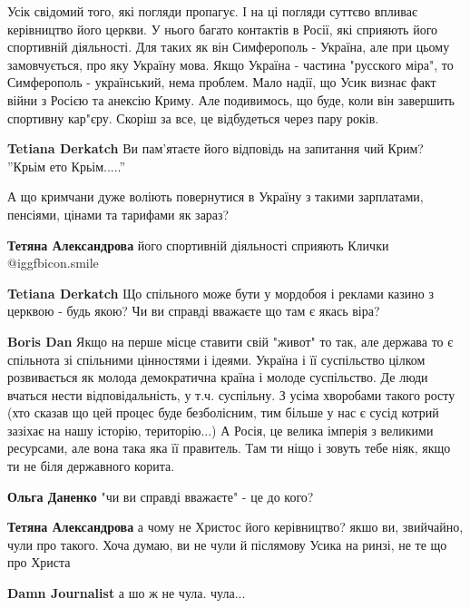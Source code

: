 \begin{itemize}
\begin{itemize}
\end{itemize} %


Усік свідомий того, які погляди пропагує. І на ці погляди суттєво впливає
керівництво його церкви. У нього багато контактів в Росії, які сприяють його
спортивній діяльності. Для таких як він Симферополь - Україна, але при цьому
замовчується, про яку Україну мова. Якщо Україна - частина "русского міра", то
Симферополь - український, нема проблем. Мало надії, що Усик визнає факт війни
з Росією та анексію Криму. Але подивимось, що буде, коли він завершить
спортивну кар"єру. Скоріш за все, це відбудеться через пару років.

\begin{itemize} %
\textbf{Tetiana Derkatch} Ви пам'ятаєте його відповідь на запитання чий Крим? ''Крьім ето Крьім.....''

А що кримчани дуже воліють повернутися в Україну з такими зарплатами, пенсіями, цінами та тарифами як зараз?

\textbf{Тетяна Александрова} його спортивній діяльності сприяють Клички  @igg{fbicon.smile} 

\textbf{Tetiana Derkatch} Що спільного може бути у мордобоя і реклами казино з церквою - будь якою? Чи ви справді вважаєте що там є якась віра?

\textbf{Boris Dan} Якщо на перше місце ставити свій "живот" то так, але держава то є спільнота зі спільними цінностями і ідеями. Україна і її суспільство цілком розвивається як молода демократична країна і молоде суспільство. Де люди вчаться нести відповідальність, у т.ч. суспільну. З усіма хворобами такого росту (хто сказав що цей процес буде безболісним, тим більше у нас є сусід котрий зазіхає на нашу історію, територію...) А Росія, це велика імперія з великими ресурсами, але вона така яка її правитель. Там ти ніщо і зовуть тебе ніяк, якщо ти не біля державного корита.

\textbf{Ольга Даненко} "чи ви справді вважаєте" - це до кого?

\textbf{Тетяна Александрова} а чому не Христос його керівництво? якшо ви, звийчайно, чули про такого. Хоча думаю, ви не чули й післямову Усика на ринзі, не те що про Христа

\textbf{Damn Journalist} а шо ж не чула. чула...


\end{itemize}
\end{itemize}
